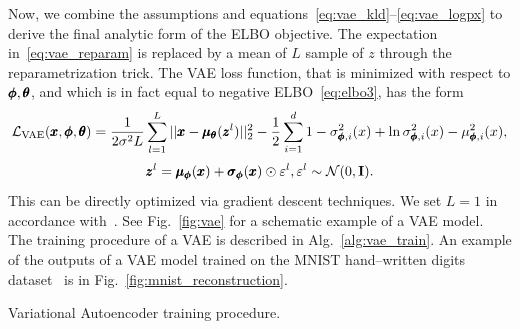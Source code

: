 Now, we combine the assumptions and equations~\eqref{eq:vae_kld}--\eqref{eq:vae_logpx} to derive the final analytic form of the ELBO objective. The expectation in~\eqref{eq:vae_reparam} is replaced by a mean of $L$ sample of $z$ through the reparametrization trick. The VAE loss function, that is minimized with respect to $\pmb{{\phi}}, \pmb{{\theta}}$, and which is in fact equal to negative ELBO~\eqref{eq:elbo3}, has the form
\begin{equation} \label{eq:vae_loss}
\mathcal{L_{\text{VAE}}}(\pmb{{x}},\pmb{{\phi}},\pmb{{\theta}})=\frac{1}{2\sigma^2 L}\sum_{l=1}^{L}||\pmb{{x}}-\pmb{{\mu}}_{\pmb{{\theta}}}(\pmb{{z}}^{l})||_{2}^{2} - \frac{1}{2}\sum_{i=1}^{d} 1-\sigma_{\pmb{{\phi}},i}^{2}(x)+\ln\sigma_{\pmb{{\phi}},i}^{2}(x)-\mu_{\pmb{{\phi}},i}^{2}(x),
\end{equation}
\begin{equation} 
\pmb{{z}}^l=\pmb{{\mu}}_{\pmb{{\phi}}}(\pmb{{x}})+\pmb{{\sigma}}_{\pmb{{\phi}}}(\pmb{{x}}) \odot \varepsilon^l, \varepsilon^l \sim  \mathcal{N}(0,\mathbf{I}). \nonumber
\end{equation}
This can be directly optimized via gradient descent techniques. We set $L=1$ in accordance with~\cite{kingma2013vae}. See Fig.~\ref{fig:vae} for a schematic example of a VAE model. The training procedure of a VAE is described in Alg.~\ref{alg:vae_train}. An example of the outputs of a VAE model trained on the MNIST hand--written digits dataset~\cite{lecun-mnisthandwrittendigit-2010} is in Fig.~\ref{fig:mnist_reconstruction}.

\begin{algorithm}
\caption{Variational Autoencoder training procedure.}
\label{alg:vae_train}
\end{algorithm}

